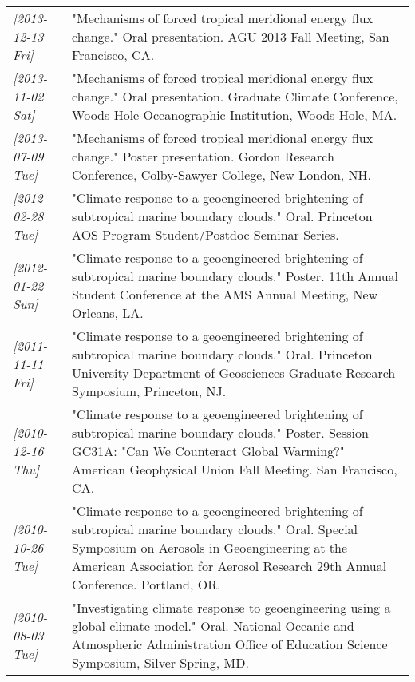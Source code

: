 \documentclass{article}
\begin{document}
\begin{center}
\begin{tabularx}{\textwidth}{lX}
\textit{[2013-12-13 Fri]} & "Mechanisms of forced tropical meridional energy flux change."  Oral presentation.  AGU 2013 Fall Meeting, San Francisco, CA.\\
\textit{[2013-11-02 Sat]} & "Mechanisms of forced tropical meridional energy flux change."  Oral presentation.  Graduate Climate Conference, Woods Hole Oceanographic Institution, Woods Hole, MA.\\
\textit{[2013-07-09 Tue]} & "Mechanisms of forced tropical meridional energy flux change."  Poster presentation.  Gordon Research Conference, Colby-Sawyer College, New London, NH.\\
\textit{[2012-02-28 Tue]} & "Climate response to a geoengineered brightening of subtropical marine boundary clouds."  Oral.  Princeton AOS Program Student/Postdoc Seminar Series.\\
\textit{[2012-01-22 Sun]} & "Climate response to a geoengineered brightening of subtropical marine boundary clouds."  Poster.  11th Annual Student Conference at the AMS Annual Meeting, New Orleans, LA.\\
\textit{[2011-11-11 Fri]} & "Climate response to a geoengineered brightening of subtropical marine boundary clouds."  Oral.  Princeton University Department of Geosciences Graduate Research Symposium, Princeton, NJ.\\
\textit{[2010-12-16 Thu]} & "Climate response to a geoengineered brightening of subtropical marine boundary clouds."  Poster.  Session GC31A: "Can We Counteract Global Warming?" American Geophysical Union Fall Meeting.  San Francisco, CA.\\
\textit{[2010-10-26 Tue]} & "Climate response to a geoengineered brightening of subtropical marine boundary clouds."  Oral.  Special Symposium on Aerosols in Geoengineering at the American Association for Aerosol Research 29th Annual Conference.  Portland, OR.\\
\textit{[2010-08-03 Tue]} & "Investigating climate response to geoengineering using a global climate model."  Oral.  National Oceanic and Atmospheric Administration Office of Education Science Symposium, Silver Spring, MD.\\
\end{tabularx}
\end{center}
\end{document}
